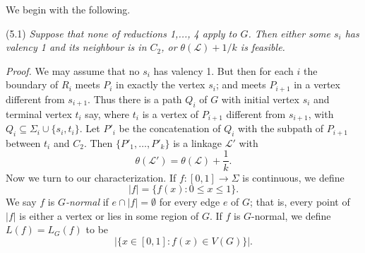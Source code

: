 We begin with the following.

\stmt
(5.1) \textit{Suppose that none of reductions 1,..., 4 apply to $G$. Then either some $s_i$ has valency 1 and its neighbour is in $C_2$, or $\theta(\mathcal{L}) + 1/k$ is feasible.}

\textit{Proof.} We may assume that no $s_i$ has valency 1. But then for each $i$ the boundary of $R_i$ meets $P_i$ in exactly the vertex $s_i$; and meets $P_{i+1}$ in a vertex different from $s_{i+1}$. Thus there is a path $Q_i$ of $G$ with initial vertex $s_i$ and terminal vertex $t_i$ say, where $t_i$ is a vertex of $P_{i+1}$ different from $s_{i+1}$, with $Q_i \subseteq \Sigma_i \cup \{s_i, t_i\}$. Let $P'_i$ be the concatenation of $Q_i$ with the subpath of $P_{i+1}$ between $t_i$ and $C_2$. Then $\{P'_1, \dots, P'_k\}$ is a linkage $\mathcal{L}'$ with
\begin{equation*}
\theta(\mathcal{L}') = \theta(\mathcal{L}) + \frac{1}{k}.
\end{equation*}
Now we turn to our characterization. If $f: [0, 1] \to \Sigma$ is continuous, we define
\begin{equation*}
|f| = \{f(x): 0 \le x \le 1\}.
\end{equation*}
We say $f$ is \textit{$G$-normal} if $e \cap |f| = \emptyset$ for every edge $e$ of $G$; that is, every point of $|f|$ is either a vertex or lies in some region of $G$. If $f$ is $G$-normal, we define $L(f) = L_G(f)$ to be
\begin{equation*}
|\{x \in [0, 1]: f(x) \in V(G)\}|.
\end{equation*}
